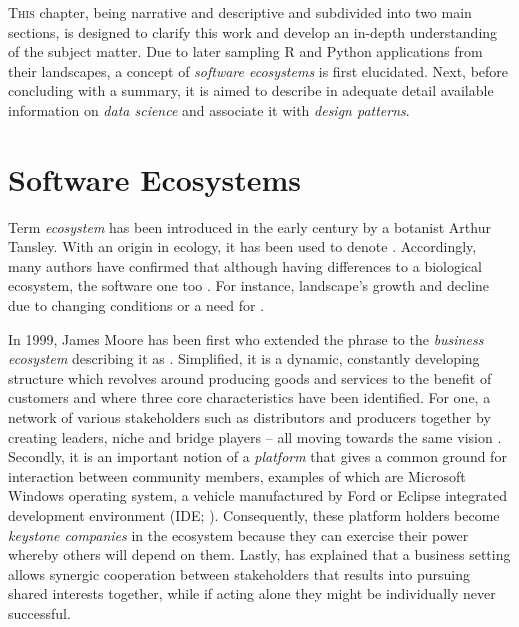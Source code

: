 \lettrine[lines=2]{\color{BrickRed}T}{his} chapter, being narrative and descriptive and subdivided into two main sections, is designed to clarify this work and develop an in-depth understanding of the subject matter.
Due to later sampling R and Python applications from their landscapes, a concept of \emph{software ecosystems} is first elucidated. 
Next, before concluding with a summary, it is aimed to describe in adequate detail available information on \emph{data science} and associate it with \emph{design patterns}.

\section{Software Ecosystems}
\label{secos}
Term \emph{ecosystem} has been introduced in the early  century by a botanist Arthur Tansley.
With an origin in ecology, it has been used to denote  \parencite[4]{Franco-Bedoya2017OpenMapping}.
Accordingly, many authors have confirmed that although having differences to a biological ecosystem, the software one  too \parencites[101]{Dhungana2010SoftwareNature}{Jansen2013DefiningGovernance}.
For instance, landscape's growth and decline due to changing conditions or a need for  \parencites[98]{Dhungana2010SoftwareNature}{Mens2014}.

In 1999, James Moore has been first who extended the phrase to the \emph{business ecosystem} describing it as  \parencites[45]{JamesF.Moore1999TheEcosystems}{Jansen2013DefiningGovernance}.
Simplified, it is a dynamic, constantly developing structure which revolves around producing goods and services to the benefit of customers and where three core characteristics have been identified.
For one, a network of various stakeholders such as distributors and producers  together by creating leaders, niche and bridge players -- all moving towards the same vision \parencites[45]{Jansen2013DefiningGovernance}{LiYanRu2009}.
Secondly, it is an important notion of a \emph{platform} that gives a common ground for interaction between community members, examples of which are Microsoft Windows operating system, a vehicle manufactured by Ford or Eclipse integrated development environment (\ac{IDE}; \cite{JamesF.Moore1999TheEcosystems}).
Consequently, these platform holders become \emph{keystone companies} in the ecosystem because they can exercise their power whereby others will depend on them.
Lastly, \textcite{LiYanRu2009} has explained that a business setting allows synergic cooperation between stakeholders that results into pursuing shared interests together, while if acting alone they might be individually never successful.

